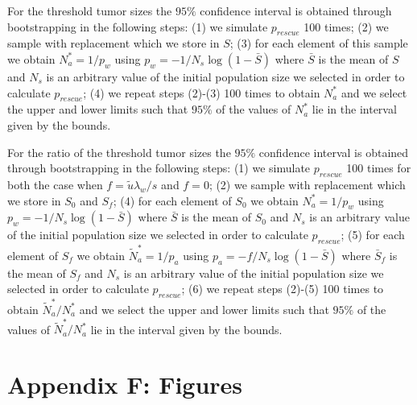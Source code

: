 \documentclass[12pt]{extarticle}
\begin{document}
\begin{appendices}
For the threshold tumor sizes the $95\%$ confidence interval is obtained through bootstrapping in the following steps: (1) we simulate $p_{rescue}$ 100 times; (2) we sample with replacement which we store in $S$; (3) for each element of this sample we obtain $N_a^*=1/p_w$ using $p_w=-1/N_s\log\left(1-\bar{S}\right)$ where $\bar{S}$ is the mean of $S$ and $N_s$ is an arbitrary value of the initial population size we selected in order to calculate $p_{rescue}$; (4) we repeat steps (2)-(3) 100 times to obtain $N_a^*$ and we select the upper and lower limits such that $95\%$ of the values of $N_a^*$ lie in the interval given by the bounds.

For the ratio of the threshold tumor sizes the $95\%$ confidence interval is obtained through bootstrapping in the following steps: (1) we simulate $p_{rescue}$ 100 times for both the case when $f=\tilde{u}\lambda_w/s$ and $f=0$; (2) we sample with replacement which we store in $S_0$ and  $S_f$; (4) for each element of $S_0$ we obtain $N_a^*=1/p_w$ using $p_w=-1/N_s\log\left(1-\bar{S}\right)$ where $\bar{S}$ is the mean of $S_0$ and $N_s$ is an arbitrary value of the initial population size we selected in order to calculate $p_{rescue}$; (5) for each element of $S_f$ we obtain $\tilde{N}_a^*=1/p_a$ using $p_a=-f/N_s\log\left(1-\bar{S}\right)$ where $\bar{S}_f$ is the mean of $S_f$ and $N_s$ is an arbitrary value of the initial population size we selected in order to calculate $p_{rescue}$; (6) we repeat steps (2)-(5) 100 times to obtain $\tilde{N}_a^*/N_a^*$ and we select the upper and lower limits such that $95\%$ of the values of $\tilde{N}_a^*/N_a^*$ lie in the interval given by the bounds.
\clearpage

\section*{Appendix F: Figures}


\end{appendices}
\end{document}
